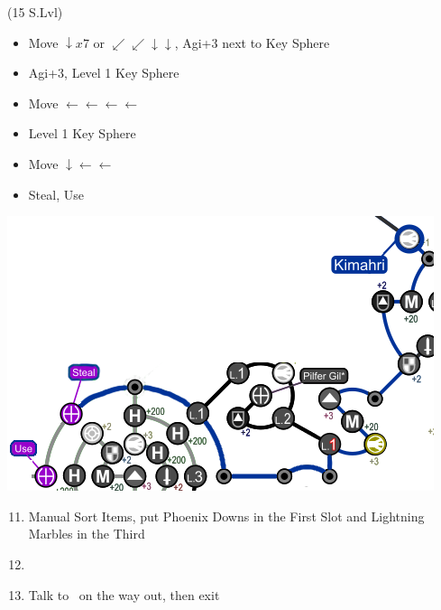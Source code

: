 \begin{spheregrid}
\begin{multicols}{2}
\begin{itemize}
			\kimahrif (15 S.Lvl)
			\begin{itemize}
				\item Move $\downarrow x7$ or $\swarrow\swarrow\downarrow\downarrow$, Agi+3 next to Key Sphere
				\item Agi+3, Level 1 Key Sphere
				\item Move $\leftarrow\leftarrow\leftarrow\leftarrow$
				\item Level 1 Key Sphere
				\item Move $\downarrow\leftarrow\leftarrow$
				\item Steal, Use
			\end{itemize}
			\includegraphics[width=.8\columnwidth]{graphics/Kimahri_post_spheremorph}
		\end{itemize}
	\end{multicols}
\end{spheregrid}
\colstart
\begin{enumerate}
	\setcounter{enumi}{10}
	\item Manual Sort Items, put Phoenix Downs in the First Slot and Lightning Marbles in the Third
	\item \formation{\tidus}{\lulu}{\kimahri}
	\item Talk to \auron\ on the way out, then exit
\end{enumerate}
\newpage